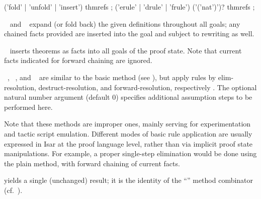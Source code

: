 \begin{isabellebody}
\begin{isamarkuptext}
  \begin{rail}
    ('fold' | 'unfold' | 'insert') thmrefs
    ;
    ('erule' | 'drule' | 'frule') ('('nat')')? thmrefs
    ;
  \end{rail}

  \begin{descr}
  
  \item [\mbox{\isa{unfold}}~\isa{{\isachardoublequote}a\isactrlsub {\isadigit{1}}\ {\isasymdots}\ a\isactrlsub n{\isachardoublequote}} and \mbox{\isa{fold}}~\isa{{\isachardoublequote}a\isactrlsub {\isadigit{1}}\ {\isasymdots}\ a\isactrlsub n{\isachardoublequote}}] expand (or fold back) the
  given definitions throughout all goals; any chained facts provided
  are inserted into the goal and subject to rewriting as well.

  \item [\mbox{\isa{insert}}~\isa{{\isachardoublequote}a\isactrlsub {\isadigit{1}}\ {\isasymdots}\ a\isactrlsub n{\isachardoublequote}}] inserts
  theorems as facts into all goals of the proof state.  Note that
  current facts indicated for forward chaining are ignored.

  \item [\mbox{\isa{erule}}~\isa{{\isachardoublequote}a\isactrlsub {\isadigit{1}}\ {\isasymdots}\ a\isactrlsub n{\isachardoublequote}}, \mbox{\isa{drule}}~\isa{{\isachardoublequote}a\isactrlsub {\isadigit{1}}\ {\isasymdots}\ a\isactrlsub n{\isachardoublequote}}, and \mbox{\isa{frule}}~\isa{{\isachardoublequote}a\isactrlsub {\isadigit{1}}\ {\isasymdots}\ a\isactrlsub n{\isachardoublequote}}] are similar to the basic \mbox{}
  method (see ), but apply rules by
  elim-resolution, destruct-resolution, and forward-resolution,
  respectively \cite{isabelle-ref}.  The optional natural number
  argument (default 0) specifies additional assumption steps to be
  performed here.

  Note that these methods are improper ones, mainly serving for
  experimentation and tactic script emulation.  Different modes of
  basic rule application are usually expressed in Isar at the proof
  language level, rather than via implicit proof state manipulations.
  For example, a proper single-step elimination would be done using
  the plain \mbox{} method, with forward chaining of current
  facts.

  \item [\mbox{\isa{succeed}}] yields a single (unchanged) result; it is
  the identity of the ``\isa{{\isachardoublequote}{\isacharcomma}{\isachardoublequote}}'' method combinator (cf.\
  ).


\end{descr}
\end{isamarkuptext}
\end{isabellebody}
